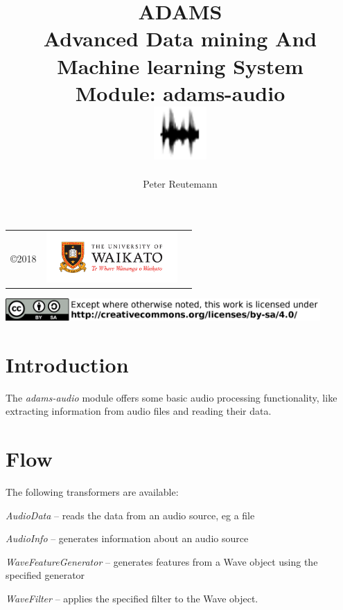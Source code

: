 \documentclass[a4paper]{book}
\title{
  \textbf{ADAMS} \\
  {\Large \textbf{A}dvanced \textbf{D}ata mining \textbf{A}nd \textbf{M}achine
  learning \textbf{S}ystem} \\
  {\Large Module: adams-audio} \\
  \vspace{1cm}
  \includegraphics[width=2cm]{images/audio-module.png} \\
}
\author{
  Peter Reutemann
}
\begin{document}
\begin{titlepage}
\maketitle

\thispagestyle{empty}
\center
\begin{table}[b]
	\begin{tabular}{c l l}
		\parbox[c][2cm]{2cm}{\copyright 2018} &
		\parbox[c][2cm]{5cm}{\includegraphics[width=5cm]{images/coat_of_arms.pdf}} \\
	\end{tabular}
	\includegraphics[width=12cm]{images/cc.png} \\
\end{table}

\end{titlepage}

\tableofcontents

\chapter{Introduction}
The \textit{adams-audio} module offers some basic audio processing functionality,
like extracting information from audio files and reading their data.

\chapter{Flow}
The following transformers are available:
\begin{tight_itemize}
  \item \textit{AudioData} -- reads the data from an audio source, eg a file
  \item \textit{AudioInfo} -- generates information about an audio source
  \item \textit{WaveFeatureGenerator} -- generates features from a Wave object
  using the specified generator
  \item \textit{WaveFilter} -- applies the specified filter to the Wave object.
\end{tight_itemize}
\end{document}
